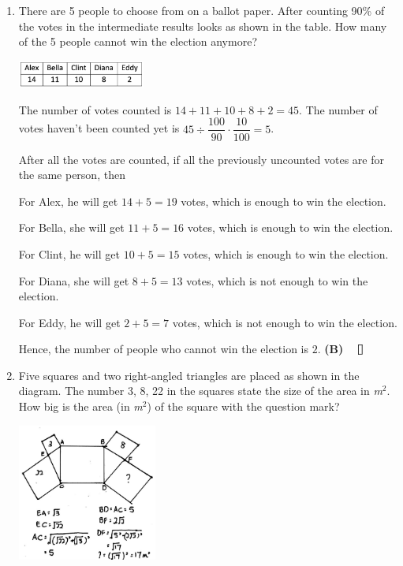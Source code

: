\documentclass{report}
\begin{document}
\begin{multicols}{2}
\begin{enumerate}
        \item There are 5 people to choose from on a ballot paper. After counting 90\% of the
              votes in the intermediate results looks as shown in the table. How many of the
              5 people cannot win the election anymore?
              \begin{center}
                  \includegraphics[width=0.33\textwidth]{pictures/8.png}
              \end{center}

              The number of votes counted is $14 + 11 + 10 + 8 +2 = 45$. The number of votes
              haven't been counted yet is $45 \div \dfrac{100}{90} \cdot \dfrac{10}{100} =
                  5$.

              After all the votes are counted, if all the previously uncounted votes are for
              the same person, then

              For Alex, he will get $14 + 5 = 19$ votes, which is enough to win the election.

              For Bella, she will get $11 + 5 = 16$ votes, which is enough to win the
              election.

              For Clint, he will get $10 + 5 = 15$ votes, which is enough to win the
              election.

              For Diana, she will get $8 + 5 = 13$ votes, which is not enough to win the
              election.

              For Eddy, he will get $2 + 5 = 7$ votes, which is not enough to win the
              election.

              Hence, the number of people who cannot win the election is $2$. \textbf{(B)}
              $\eos$

        \item Five squares and two right-angled triangles are placed as shown in the diagram.
              The number 3, 8, 22 in the squares state the size of the area in
              \textit{m}$^2$. How big is the area (in \textit{m}$^2$) of the square with the
              question mark?

              \sol{}

              \begin{center}
                  \includegraphics[width=0.36\textwidth]{pictures/9.png}
              \end{center}


\end{enumerate}
\end{multicols}
\end{document}
